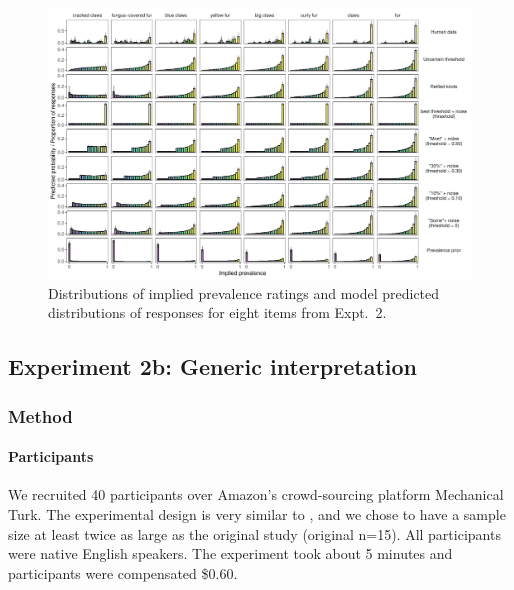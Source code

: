 \documentclass[floatsintext,doc]{apa6}
\let\oldparagraph\paragraph
\renewcommand{\paragraph}[1]{\oldparagraph{#1}\mbox{}}
\begin{document}
\begin{figure}
\centering
\includegraphics{figs/cimpian-fullDistributions-variousFixeds-1.pdf}
\caption{Distributions of implied prevalence ratings and model predicted distributions of responses for eight items from Expt.~2.
}
\label{fig:cimpian-modelingResults-bars}
\end{figure}


\subsection{Experiment 2b: Generic interpretation}

\subsubsection{Method}\label{method}

\paragraph{Participants}
We recruited 40 participants over Amazon's crowd-sourcing platform Mechanical Turk.
The experimental design is very similar to , and we chose to have a sample size at least twice as large as the original study (original n=15).
All participants were native English speakers.
The experiment took about 5 minutes and participants were compensated \$0.60.

\end{document}
